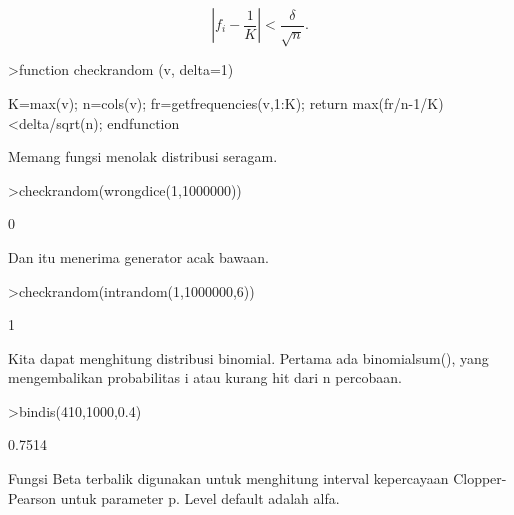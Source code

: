 \documentclass[a4paper,10pt]{article}
\begin{document}
\begin{eulernotebook}
\begin{eulercomment}
\begin{eulercomment}
\begin{eulercomment}
\begin{eulercomment}
\begin{eulercomment}
\begin{eulercomment}
\begin{eulercomment}
\end{eulercomment}
\begin{eulerformula}
\[
\left|f_i-\frac{1}{K}\right| < \frac{\delta}{\sqrt{n}}.
\]
\end{eulerformula}
\begin{eulerprompt}
>function checkrandom (v, delta=1) 
\end{eulerprompt}
\begin{eulerudf}
  K=max(v); n=cols(v);
  fr=getfrequencies(v,1:K);
  return max(fr/n-1/K)<delta/sqrt(n);
  endfunction 
\end{eulerudf}
\begin{eulercomment}
Memang fungsi menolak distribusi seragam.
\end{eulercomment}
\begin{eulerprompt}
>checkrandom(wrongdice(1,1000000)) 
\end{eulerprompt}
\begin{euleroutput}
  0
\end{euleroutput}
\begin{eulercomment}
Dan itu menerima generator acak bawaan.
\end{eulercomment}
\begin{eulerprompt}
>checkrandom(intrandom(1,1000000,6))
\end{eulerprompt}
\begin{euleroutput}
  1
\end{euleroutput}
\begin{eulercomment}
Kita dapat menghitung distribusi binomial. Pertama ada binomialsum(),
yang mengembalikan probabilitas i atau kurang hit dari n percobaan.
\end{eulercomment}
\begin{eulerprompt}
>bindis(410,1000,0.4)
\end{eulerprompt}
\begin{euleroutput}
  0.7514
\end{euleroutput}
\begin{eulercomment}
Fungsi Beta terbalik digunakan untuk menghitung interval kepercayaan
Clopper-Pearson untuk parameter p. Level default adalah alfa.


\end{eulercomment}
\end{eulercomment}
\end{eulercomment}
\end{eulercomment}
\end{eulercomment}
\end{eulercomment}
\end{eulercomment}
\end{eulernotebook}
\end{document}
